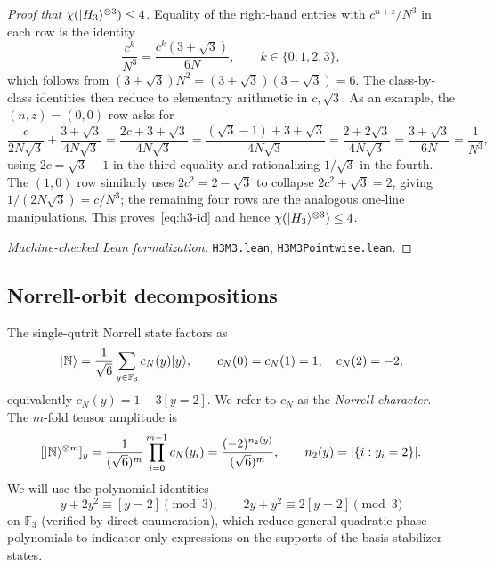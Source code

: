 \documentclass[11pt]{article}
\theoremstyle{definition}
\newcommand{\microspace}{\mspace{0.5mu}}
\newcommand{\ket}[1]{\lvert\microspace #1 \microspace \rangle}
\newcommand{\F}{\mathcal{F}}
\renewcommand{\F}[1]{\mathbb{F}_{#1}}
\newcommand{\chiR}{\chi}
\newcommand{\Hth}{\ket{H_3}}
\newcommand{\Norrell}{\ket{\mathbb{N}}}
\begin{document}
\begin{proof}[Proof that $\chiR(\Hth^{\otimes 3}) \le 4$]
		Equality of the right-hand entries with $c^{n+z}/N^3$ in each row is
		the identity
		\begin{equation}\label{eq:h3-collapse}
			\frac{c^k}{N^3} = \frac{c^k (3 + \sqrt 3)}{6 N},
			\qquad k \in \{0, 1, 2, 3\},
		\end{equation}
		which follows from $(3 + \sqrt 3) N^2 = (3 + \sqrt 3)(3 - \sqrt 3) = 6$.
		The class-by-class identities then reduce to elementary arithmetic
		in $c, \sqrt 3$. As an example, the $(n, z) = (0, 0)$ row asks for
		\begin{equation}\label{eq:h3-row00}
			\frac{c}{2 N \sqrt 3} + \frac{3 + \sqrt 3}{4 N \sqrt 3}
			= \frac{2 c + 3 + \sqrt 3}{4 N \sqrt 3}
			= \frac{(\sqrt 3 - 1) + 3 + \sqrt 3}{4 N \sqrt 3}
			= \frac{2 + 2\sqrt 3}{4 N \sqrt 3}
			= \frac{3 + \sqrt 3}{6 N}
			= \frac{1}{N^3},
		\end{equation}
		using $2c = \sqrt 3 - 1$ in the third equality and rationalizing
		$1/\sqrt 3$ in the fourth. The $(1, 0)$ row similarly uses
		$2c^2 = 2 - \sqrt 3$ to collapse $2 c^2 + \sqrt 3 = 2$, giving
		$1/(2 N \sqrt 3) = c/N^3$; the remaining four rows are the
		analogous one-line manipulations. This proves~\eqref{eq:h3-id} and
		hence $\chiR(\Hth^{\otimes 3}) \le 4$.

		\textit{Machine-checked Lean formalization:}
		\texttt{H3M3.lean},
		\texttt{H3M3Pointwise.lean}.
	\end{proof}
	
	\subsection{\texorpdfstring{Norrell-orbit decompositions}{Norrell-orbit decompositions}}\label{app:norrell}
	
	The single-qutrit Norrell state factors as
	\begin{equation}\label{eq:norrell-character-form}
		\Norrell = \frac{1}{\sqrt 6} \sum_{y \in \F{3}} c_N(y)  \ket{y},
		\qquad
		c_N(0) = c_N(1) = 1, \quad c_N(2) = -2;
	\end{equation}
	equivalently $c_N(y) = 1 - 3 [y = 2]$. We refer to $c_N$ as the
	\emph{Norrell character}. The $m$-fold tensor amplitude is
	\begin{equation}\label{eq:norrell-tensor}
		[\Norrell^{\otimes m}]_y
		= \frac{1}{(\sqrt 6)^m} \prod_{i=0}^{m-1} c_N(y_i)
		= \frac{(-2)^{n_2(y)}}{(\sqrt 6)^m},
		\qquad
		n_2(y) = |\{ i : y_i = 2 \}|.
	\end{equation}
	We will use the polynomial identities
	\begin{equation}\label{eq:norrell-y2-reduction}
		y + 2 y^2 \equiv [y = 2] \pmod 3, \qquad
		2 y + y^2 \equiv 2  [y = 2] \pmod 3
	\end{equation}
	on $\F{3}$ (verified by direct enumeration), which reduce general
	quadratic phase polynomials to indicator-only expressions on the
	supports of the basis stabilizer states.
	
\end{document}
